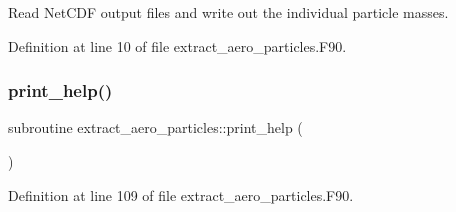 Read Net\+C\+DF output files and write out the individual particle masses. 



Definition at line 10 of file extract\+\_\+aero\+\_\+particles.\+F90.

\mbox{\label{extract__aero__particles_8_f90_a902971525680148df008f4a2800cb828}} 
\subsubsection{\texorpdfstring{print\+\_\+help()}{print\_help()}}
{\footnotesize\ttfamily subroutine extract\+\_\+aero\+\_\+particles\+::print\+\_\+help (\begin{DoxyParamCaption}{ }\end{DoxyParamCaption})}



Definition at line 109 of file extract\+\_\+aero\+\_\+particles.\+F90.

